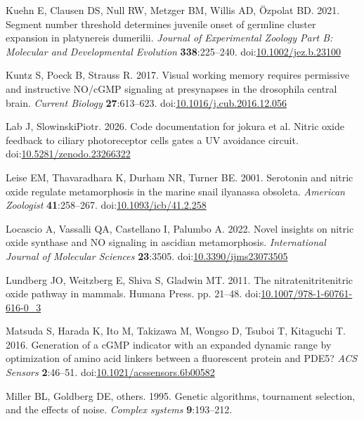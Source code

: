 \documentclass[
  11pt,
  letterpaper,
  DIV=11,
  numbers=noendperiod]{scrartcl}
\newlength{\cslhangindent}
\newenvironment{CSLReferences}[2] %
 {\begin{list}{}{%
  \setlength{\itemindent}{0pt}
  \setlength{\leftmargin}{0pt}
  \setlength{\parsep}{0pt}
  \ifodd #1
   \setlength{\leftmargin}{\cslhangindent}
   \setlength{\itemindent}{-1\cslhangindent}
  \fi
  \setlength{\itemsep}{#2\baselineskip}}}
 {\end{list}}
\begin{document}
\begin{CSLReferences}{1}{0}
Kuehn E, Clausen DS, Null RW, Metzger BM, Willis AD, Özpolat BD. 2021.
Segment number threshold determines juvenile onset of germline cluster
expansion in platynereis dumerilii. \emph{Journal of Experimental
Zoology Part B: Molecular and Developmental Evolution}
\textbf{338}:225--240.
doi:\href{https://doi.org/10.1002/jez.b.23100}{10.1002/jez.b.23100}

Kuntz S, Poeck B, Strauss R. 2017. Visual working memory requires
permissive and instructive NO/cGMP signaling at presynapses in the
drosophila central brain. \emph{Current Biology} \textbf{27}:613--623.
doi:\href{https://doi.org/10.1016/j.cub.2016.12.056}{10.1016/j.cub.2016.12.056}

Lab J, SlowinskiPiotr. 2026. Code documentation for jokura et al. Nitric
oxide feedback to ciliary photoreceptor cells gates a UV avoidance
circuit.
doi:\href{https://doi.org/10.5281/zenodo.23266322}{10.5281/zenodo.23266322}

Leise EM, Thavaradhara K, Durham NR, Turner BE. 2001. Serotonin and
nitric oxide regulate metamorphosis in the marine snail ilyanassa
obsoleta. \emph{American Zoologist} \textbf{41}:258--267.
doi:\href{https://doi.org/10.1093/icb/41.2.258}{10.1093/icb/41.2.258}

Locascio A, Vassalli QA, Castellano I, Palumbo A. 2022. Novel insights
on nitric oxide synthase and NO signaling in ascidian metamorphosis.
\emph{International Journal of Molecular Sciences} \textbf{23}:3505.
doi:\href{https://doi.org/10.3390/ijms23073505}{10.3390/ijms23073505}

Lundberg JO, Weitzberg E, Shiva S, Gladwin MT. 2011. The
nitrate{\textendash}nitrite{\textendash}nitric oxide pathway in mammals.
Humana Press. pp. 21--48.
doi:\href{https://doi.org/10.1007/978-1-60761-616-0_3}{10.1007/978-1-60761-616-0\_3}

Matsuda S, Harada K, Ito M, Takizawa M, Wongso D, Tsuboi T, Kitaguchi T.
2016. Generation of a cGMP indicator with an expanded dynamic range by
optimization of amino acid linkers between a fluorescent protein and
PDE5? \emph{ACS Sensors} \textbf{2}:46--51.
doi:\href{https://doi.org/10.1021/acssensors.6b00582}{10.1021/acssensors.6b00582}

{Miller BL, Goldberg DE, others}. 1995. Genetic algorithms, tournament
selection, and the effects of noise. \emph{Complex systems}
\textbf{9}:193--212.


\end{CSLReferences}
\end{document}
